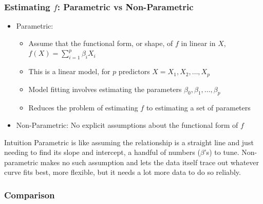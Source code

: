 \begin{frame}[fragile]\frametitle{Estimating $f$: Parametric vs Non-Parametric}
\begin{itemize}
\item Parametric:
	\begin{itemize}
	\item Assume that the functional form, or shape, of $f$ in linear in $X$, $f(X) = \sum_{i=1}^p \beta_i X_i$
	\item This is a linear model, for $p$ predictors $X = {X_1, X_2,\ldots, X_p}$
	\item Model fitting involves estimating the parameters $\beta_0, \beta_1,\ldots,\beta_p$
	\item Reduces the problem of estimating $f$ to estimating a set of parameters
	\end{itemize}
\item Non-Parametric: No explicit assumptions about the functional form of $f$
\end{itemize}
\begin{block}{Intuition}
Parametric is like assuming the relationship is a straight line and just needing to find its slope and intercept, a handful of numbers ($\beta$'s) to tune. Non-parametric makes no such assumption and lets the data itself trace out whatever curve fits best, more flexible, but it needs a lot more data to do so reliably.
\end{block}
\end{frame}

\begin{frame}[fragile] \frametitle{Comparison}

\hfill
{}
\end{frame}

